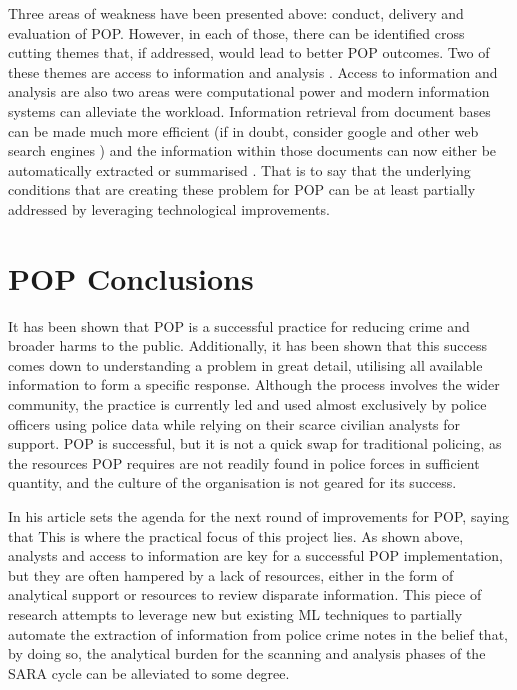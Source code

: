 Three areas of weakness have been presented above: conduct, delivery and evaluation of POP. However, in each of those, there can be identified cross cutting themes that, if addressed, would lead to better POP outcomes. Two of these themes are access to information and analysis  \parencite{POPUCL}. Access to information and analysis are also two areas were computational power and modern information systems can alleviate the workload. Information retrieval from document bases can be made much more efficient (if in doubt, consider google and other web search engines \parencite{manning2008introduction}) and the information within those documents can now either be automatically extracted or summarised \parencite{kumar2011natural}. That is to say that the underlying conditions that are creating these problem for POP can be at least partially addressed by leveraging technological improvements.

\section{POP Conclusions}


It has been shown that POP is a successful practice for reducing crime and broader harms to the public. Additionally, it has been shown that this success comes down to understanding a problem in great detail, utilising all available information to form a specific response. Although the process involves the wider community, the practice is currently led and used almost exclusively by police officers using police data while relying on their scarce civilian analysts for support. POP is successful, but it is not a quick swap for traditional policing, as the resources POP requires are not readily found in police forces in sufficient quantity, and the culture of the organisation is not geared for its success.

In his article \textcite{whitherpop} sets the agenda for the next round of improvements for POP, saying that    This is where the practical focus of this project lies. As shown above, analysts and access to information are key for a successful POP implementation, but they are often hampered by a lack of resources, either in the form of analytical support or resources to review disparate information. This piece of research attempts to leverage new but existing ML techniques to partially automate the extraction of information from police crime notes in the belief that, by doing so, the analytical burden for the scanning and analysis phases of the SARA cycle can be alleviated to some degree.


